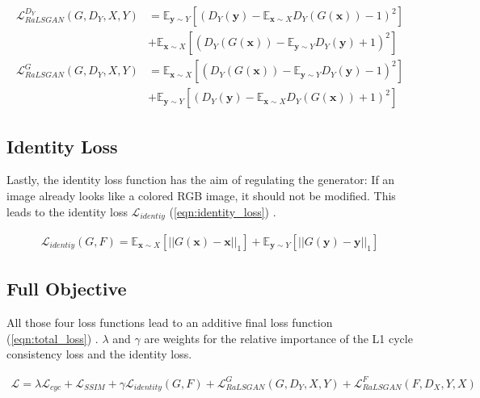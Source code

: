\documentclass[a4paper,11pt, DIV=12]{scrartcl}
\newcommand{\x}{\boldsymbol{x}}
\newcommand{\y}{\boldsymbol{y}}
\begin{document}
\begin{equation}
   \label{eqn:ralsgan}
   \begin{aligned}
      \mathcal{L}^{D_Y}_{RaLSGAN}(G,D_Y,X,Y) & = \mathbb{E}_{\y \sim Y}\left[(D_Y(\y) - \mathbb{E}_{\x \sim X} D_Y(G(\x)) - 1)^2 \right] \\
                                         & + \mathbb{E}_{\x \sim X}\left[(D_Y(G(\x)) - \mathbb{E}_{\y \sim Y} D_Y(\y) + 1)^2 \right] \\
      \mathcal{L}^G_{RaLSGAN}(G,D_Y,X,Y) & = \mathbb{E}_{\x \sim X}\left[(D_Y(G(\x)) - \mathbb{E}_{\y \sim Y} D_Y(\y) - 1)^2 \right] \\
                                         & + \mathbb{E}_{\y \sim Y}\left[(D_Y(\y) - \mathbb{E}_{\x \sim X} D_Y(G(\x)) + 1)^2 \right]
   \end{aligned}
\end{equation}

\subsection*{Identity Loss}
Lastly, the identity loss function has the aim of regulating the generator: 
If an image already looks like a colored RGB image, it should not be modified. 
This leads to the identity loss $\mathcal{L}_{identiy}$ (\autoref{eqn:identity_loss}) \cite{mehri2019colorizing}.

\begin{equation}
   \label{eqn:identity_loss}
   \begin{aligned}
      \mathcal{L}_{identiy}(G, F) = \mathbb{E}_{\x \sim X} \left[||G(\x) - \x||_1\right] + \mathbb{E}_{\y \sim Y} \left[||G(\y) - \y||_1\right]
   \end{aligned}
\end{equation}

\subsection*{Full Objective}
All those four loss functions lead to an additive final loss function (\autoref{eqn:total_loss}) \cite{mehri2019colorizing}.
$\lambda$ and $\gamma$ are weights for the relative importance of the L1 cycle consistency loss and the identity loss. 

\begin{equation}
   \label{eqn:total_loss}
   \begin{aligned}
      \mathcal{L} = \lambda \mathcal{L}_{cyc} + \mathcal{L}_{SSIM} + \gamma \mathcal{L}_{identity}(G,F) + \mathcal{L}_{RaLSGAN}^G(G,D_Y,X,Y) + \mathcal{L}_{RaLSGAN}^F(F,D_X,Y,X) 
   \end{aligned}
\end{equation}
\end{document}
